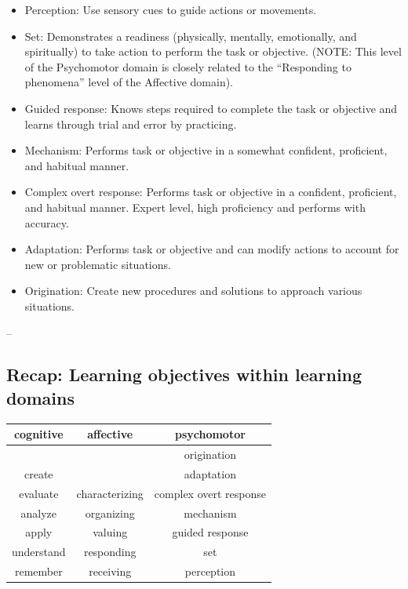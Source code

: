\documentclass[
  letterpaper,
  DIV=11,
  numbers=noendperiod]{scrartcl}
\newcounter{none} %
\providecommand{\tightlist}{%
  \setlength{\itemsep}{0pt}\setlength{\parskip}{0pt}}
\begin{document}
\begin{itemize}
\tightlist
\item
  Perception: Use sensory cues to guide actions or movements.
\item
  Set: Demonstrates a readiness (physically, mentally, emotionally, and
  spiritually) to take action to perform the task or objective. (NOTE:
  This level of the Psychomotor domain is closely related to the
  ``Responding to phenomena'' level of the Affective domain).
\item
  Guided response: Knows steps required to complete the task or
  objective and learns through trial and error by practicing.
\item
  Mechanism: Performs task or objective in a somewhat confident,
  proficient, and habitual manner.
\item
  Complex overt response: Performs task or objective in a confident,
  proficient, and habitual manner. Expert level, high proficiency and
  performs with accuracy.
\item
  Adaptation: Performs task or objective and can modify actions to
  account for new or problematic situations.
\item
  Origination: Create new procedures and solutions to approach various
  situations.
\end{itemize}

--

\subsection{Recap: Learning objectives within learning
domains}\label{recap-learning-objectives-within-learning-domains}

{\def\LTcaptype{none} %
\begin{longtable}[]{@{}ccc@{}}
\toprule\noalign{}
cognitive & affective & psychomotor \\
\midrule\noalign{}
\endhead
\bottomrule\noalign{}
\endlastfoot
& & origination \\
create & & adaptation \\
evaluate & characterizing & complex overt response \\
analyze & organizing & mechanism \\
apply & valuing & guided response \\
understand & responding & set \\
remember & receiving & perception \\
\end{longtable}
}
\end{document}
